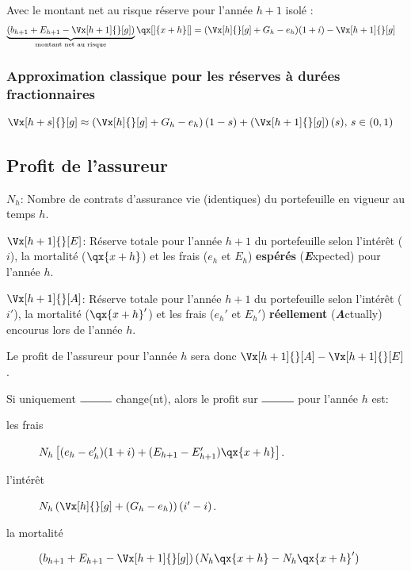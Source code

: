 \documentclass[10pt, french]{article}
\begin{document}
\begin{multicols*}{2}
Avec le montant net au risque réserve pour l'année $h + 1$ isolé :
\begin{align*}
	\underbrace{(b_{h + 1} + E_{h + 1} - \Vx[h + 1]{}[g])}_{\text{montant net au risque}} \qx[]{x+h}[]
	&= 	(\Vx[h]{}[g] + G_h - e_h)(1 + i) - \Vx[h + 1]{}[g]
\end{align*}


\subsubsection*{Approximation classique pour les réserves à durées fractionnaires}
\begin{align*}
	\Vx[h + s]{}[g]
	&\approx	\left(\Vx[h]{}[g] + G_h - e_h\right)(1 - s) + \left(\Vx[h + 1]{}[g]\right)(s), \, s \in (0, 1)
\end{align*}

\subsection*{Profit de l'assureur}
\begin{distributions}[Notation]
\begin{description}
	\item[]	$N_{h}$: Nombre de contrats d'assurance vie (identiques) du portefeuille en vigueur au temps $h$.
	\item[]	$\Vx[h + 1]{}[E]$: Réserve totale pour l'année $h + 1$ du portefeuille selon l'intérêt ($i$), la mortalité ($\qx{x + h}$) et les frais ($e_{h}$ et $E_{h}$) \textbf{espérés} (\textit{\textbf{E}}xpected) pour l'année $h$.
	\item[]	$\Vx[h + 1]{}[A]$: Réserve totale pour l'année $h + 1$ du portefeuille selon l'intérêt ($i'$), la mortalité ($\qx{x + h}'$) et les frais ($e_{h}'$ et $E_{h}'$) \textbf{réellement} (\textit{\textbf{A}}ctually) encourus lors de l'année $h$.
	\item	Le profit de l'assureur pour l'année $h$ sera donc $\Vx[h + 1]{}[A] - \Vx[h + 1]{}[E]$.
\end{description}
\end{distributions}

Si uniquement $\rule{1cm}{0.15mm}$ change(nt), alors le profit sur $\rule{1cm}{0.15mm}$ pour l'année $h$ est:
\begin{description}
	\item[les frais]	$N_{h}\left[ (e_{h} - e_{h}')(1 + i) + (E_{h + 1} - E_{h + 1}')\qx{x + h} \right]$.
	\item[l'intérêt]	$N_{h} \left( \Vx[h]{}[g] + (G_{h} - e_{h}) \right) (i' - i)$.
	\item[la mortalité]	$\left( b_{h + 1} + E_{h + 1} - \Vx[h + 1]{}[g] \right)(N_{h}\qx{x + h} - N_{h}\qx{x + h}')$
\end{description}


\end{multicols*}
\end{document}
